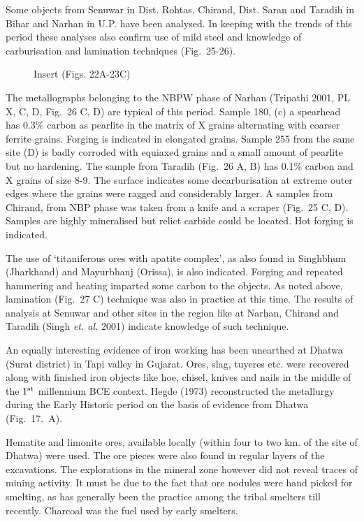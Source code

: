 Some objects from Senuwar in Dist. Rohtas, Chirand, Dist. Saran and Taradih in Bihar and Narhan in U.P. have been analysed. In keeping with the trends of this period these analyses also confirm use of mild steel and knowledge of carburisation and lamination techniques (Fig.~25-26). 

\begin{figure}[H]
Insert (Figs. 22A-23C)
\end{figure}

\newpage

The metallographs belonging to the NBPW phase of Narhan (Tripathi 2001, PL X, C, D, Fig.~26 C, D) are typical of this period. Sample 180, (c) a spearhead has 0.3\% carbon as pearlite in the matrix of X grains alternating with coarser ferrite grains. Forging is indicated in elongated grains. Sample 255 from the same site (D) is badly corroded with equiaxed grains and a small amount of pearlite but no hardening. The sample from Taradih (Fig.~26 A, B) has 0.1\% carbon and X grains of size 8-9. The surface indicates some decarburisation at extreme outer edges where the grains were ragged and considerably larger. A samples from Chirand, from NBP phase was taken from a knife and a scraper (Fig.~25 C, D). Samples are highly mineralised but relict carbide could be located. Hot forging is indicated.

The use of ‘titaniferous ores with apatite complex’, as also found in Singhbhum (Jharkhand) and Mayurbhanj (Orissa), is also indicated. Forging and repeated hammering and heating imparted some carbon to the objects. As noted above, lamination (Fig.~27 C) technique was also in practice at this time. The results of analysis at Senuwar and other sites in the region like at Narhan, Chirand and Taradih (Singh {\it et. al.} 2001) indicate knowledge of such technique. 

An equally interesting evidence of iron working has been unearthed at Dhatwa (Surat district) in Tapi valley in Gujarat. Ores, slag, tuyeres etc. were recovered along with finished iron objects like hoe, chisel, knives and nails in the middle of the $1^{\rm st}$ millennium BCE context. Hegde (1973) reconstructed the metallurgy during the Early Historic period on the basis of evidence from Dhatwa (Fig.~17.~A). 

Hematite and limonite ores, available locally (within four to two km. of the site of Dhatwa) were used. The ore pieces were also found in regular layers of the excavations. The explorations in the mineral zone however did not reveal traces of mining activity. It must be due to the fact that ore nodules were hand picked for smelting, as has generally been the practice among the tribal smelters till recently. Charcoal was the fuel used by early smelters. 

